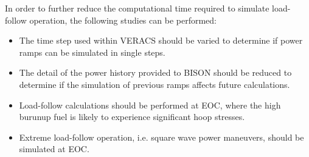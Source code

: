 \documentclass[edeposit,fullpage,11pt]{uiucthesis2009}
\begin{document}
In order to further reduce the computational time required to simulate load-follow operation, the following studies can be performed:
\begin{itemize}
\item{The time step used within \gls{VERACS} should be varied to determine if power ramps can be simulated in single steps.}
\item{The detail of the power history provided to BISON should be reduced to determine if the simulation of previous ramps affects future calculations.}
\item{Load-follow calculations should be performed at \gls{EOC}, where the high burunup fuel is likely to experience significant hoop stresses.}
\item{Extreme load-follow operation, i.e. square wave power maneuvers, should be simulated at \gls{EOC}.}
\end{itemize} 

\backmatter


\end{document}

